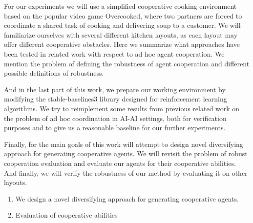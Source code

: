 For our experiments we will use a simplified cooperative cooking environment based on the popular video game Overcooked, where two partners are forced to coordinate a shared task of cooking and delivering soup to a customer.
We will familiarize ourselves with several different kitchen layouts, as each layout may offer different cooperative obstacles.
Here we summarize what approaches have been tested in related work with respect to ad hoc agent cooperation.
We mention the problem of defining the robustness of agent cooperation and different possible definitions of robustness.

And in the last part of this work, we prepare our working environment by modifying the stable-baselines3 library designed for reinforcement learning algorithms.
We try to reimplement some results from previous related work on the problem of ad hoc coordination in AI-AI settings, both for verification purposes and to give us a reasonable baseline for our further experiments.

Finally, for the main goals of this work will attempt to design novel diversifying approach for generating cooperative agents.
We will revisit the problem of robust cooperation evaluation and evaluate our agents for their cooperative abilities.
And finally, we will verify the robustness of our method by evaluating it on other layouts.

\begin{enumerate}
    \item We design a novel diversifying approach for generating cooperative agents.
    \item Evaluation of cooperative abilities
\end{enumerate}

